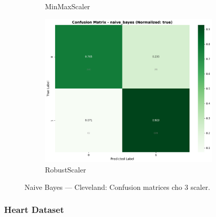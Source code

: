 \begin{figure}[H]
\begin{subfigure}[b]{0.31\textwidth}
\caption{MinMaxScaler}\label{fig:nb_clev_cm_minmax}
\end{subfigure}\hfill
\begin{subfigure}[b]{0.31\textwidth}\centering
\includegraphics[width=0.95\textwidth]{Result/cleveland_dataset/confusion_matrices/naive_bayes_numeric_dataset_RobustScaler.png}
\caption{RobustScaler}\label{fig:nb_clev_cm_robust}
\end{subfigure}
\caption{Naive Bayes — Cleveland: Confusion matrices cho 3 scaler.}
\label{fig:nb_clev_confusions}
\end{figure}

\FloatBarrier

\subsubsection{Heart Dataset}\label{subsubsec:nb-heart}


